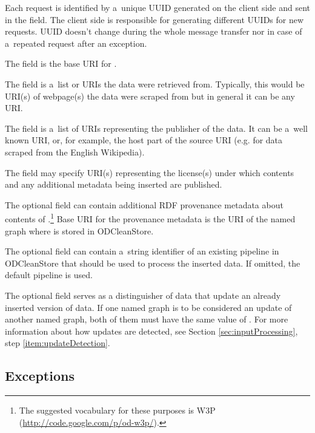 Each request is identified by a~unique UUID generated on the client side and sent in the  field.
The client side is responsible for generating different UUIDs for new requests.
UUID doesn't change during the whole message transfer nor in case of a~repeated request after an exception.

The  field is the base URI for .

The  field is a~list or URIs the data were retrieved from. Typically, this would be URI(s) of webpage(s) the data were scraped from but in general it can be any URI.

The  field is a~list of URIs representing the publisher of the data. It can be a~well known URI, or, for example, the host part of the source URI (e.g. \linebreak[4] for data scraped from the English Wikipedia).

The  field may specify URI(s) representing the license(s) under which  contents and any additional  metadata being inserted are published. 

The optional  field can contain additional RDF provenance metadata about contents of .\footnote{The suggested vocabulary for these purposes is W3P (\url{http://code.google.com/p/od-w3p/}).} Base URI for the provenance metadata is the URI of the named graph where  is stored in ODCleanStore.

The optional  field can contain a~string identifier of an existing pipeline in ODCleanStore that should be used to process the inserted data. If omitted, the default pipeline is used. 

The optional  field serves as a distinguisher of data that update an already inserted version of data. If one named graph is to be considered an update of another named graph, both of them must have the same value of . For more information about how updates are detected, see Section \ref{sec:inputProcessing}, step \ref{item:updateDetection}.

\subsection{Exceptions}

